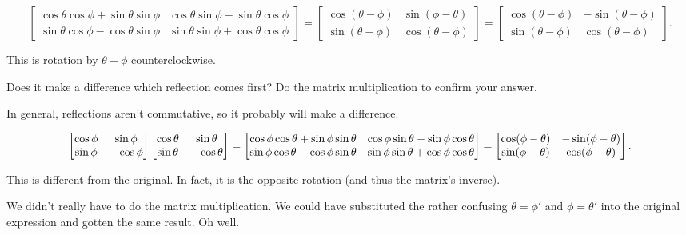 \documentclass[../gatm_answers.tex]{subfiles}
\begin{document}
$$\begin{bmatrix}
\cos\theta\cos\phi + \sin\theta\sin\phi & \cos\theta\sin\phi-\sin\theta\cos\phi \\ \sin\theta\cos\phi-\cos\theta\sin\phi & \sin\theta\sin\phi + \cos\theta\cos\phi
\end{bmatrix}=\begin{bmatrix}\cos(\theta-\phi) & \sin(\phi-\theta) \\ \sin(\theta-\phi) & \cos(\theta-\phi)\end{bmatrix}=\begin{bmatrix}\cos(\theta-\phi) & -\sin(\theta-\phi) \\ \sin(\theta-\phi) & \cos(\theta-\phi)\end{bmatrix}.
$$

This is rotation by $\theta-\phi$ counterclockwise.

\begin{inner_problem}
\item Does it make a difference which reflection comes first? Do the matrix multiplication to confirm your answer.
\end{inner_problem}

In general, reflections aren't commutative, so it probably will make a difference.

$$\begin{bmatrix} \cos\phi & \sin\phi \\ \sin\phi & -\cos\phi \end{bmatrix}\begin{bmatrix} \cos\theta & \sin\theta \\ \sin\theta & -\cos\theta \end{bmatrix}=\begin{bmatrix} \cos\phi\cos\theta + \sin\phi\sin\theta & \cos\phi\sin\theta - \sin\phi\cos\theta \\ \sin\phi\cos\theta - \cos\phi\sin\theta & \sin\phi\sin\theta + \cos\phi\cos\theta \\ \end{bmatrix} = \begin{bmatrix}\cos(\phi-\theta) & -\sin(\phi-\theta) \\ \sin(\phi-\theta) & \cos(\phi-\theta)\end{bmatrix}.$$

This is different from the original. In fact, it is the opposite rotation (and thus the matrix's inverse).

We didn't really have to do the matrix multiplication. We could have substituted the rather confusing $\theta = \phi'$ and $\phi = \theta'$ into the original expression and gotten the same result. Oh well.
\end{document}
